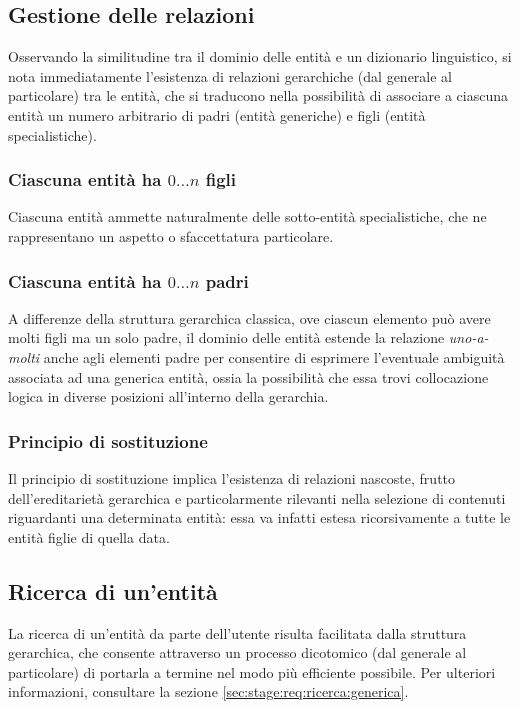 \documentclass[10pt,a4paper,headinclude,footinclude,hidelinks]{scrreprt} %
\begin{document}
	\subsection{Gestione delle relazioni}
	\label{sec:stage:req:entità:relazioni}

	Osservando la similitudine tra il dominio delle entità e un dizionario linguistico, si nota immediatamente l'esistenza di relazioni gerarchiche (dal generale al particolare) tra le entità, che si traducono nella possibilità di associare a ciascuna entità un numero arbitrario di padri (entità generiche) e figli (entità specialistiche).


	\subsubsection{Ciascuna entit\`a ha $0\ldots n$ figli}
	Ciascuna entità ammette naturalmente delle sotto-entità specialistiche, che ne rappresentano un aspetto o sfaccettatura particolare.
	\subsubsection{Ciascuna entit\`a ha $0\ldots n$ padri}
	A differenze della struttura gerarchica classica, ove ciascun elemento può avere molti figli ma un solo padre, il dominio delle entità estende la relazione \textit{uno-a-molti} anche agli elementi padre per consentire di esprimere l'eventuale ambiguità associata ad una generica entità, ossia la possibilità che essa trovi collocazione logica in diverse posizioni all'interno della gerarchia.
	\subsubsection{Principio di sostituzione}
	Il principio di sostituzione implica l'esistenza di relazioni nascoste, frutto dell'ereditarietà gerarchica e particolarmente rilevanti nella selezione di contenuti riguardanti una determinata entità: essa va infatti estesa ricorsivamente a tutte le entità figlie di quella data.   
	\subsection{Ricerca di un'entit\`a}
	La ricerca di un'entità da parte dell'utente risulta facilitata dalla struttura gerarchica, che consente attraverso un processo dicotomico (dal generale al particolare) di portarla a termine nel modo più efficiente possibile. Per ulteriori informazioni, consultare la sezione \ref{sec:stage:req:ricerca:generica}. 
\end{document}
